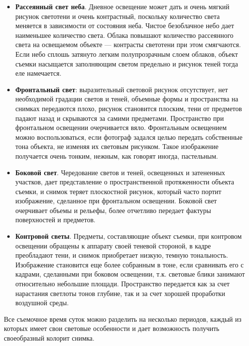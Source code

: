 \documentclass{article}
\begin{document}
\begin{itemize}
\item \textbf{Рассеянный свет неба}. Дневное освещение может дать и очень мягкий рисунок светотени и очень контрастный, поскольку количество света меняется в зависимости от состояния неба. Чистое безоблачное небо дает наименьшее количество света. Облака повышают количество рассеянного света на освещаемом объекте --- контрасты светотени при этом смягчаются. Если небо сплошь затянуто легким полупрозрачным слоем облаков, объект съемки насыщается заполняющим светом предельно и рисунок теней тогда еле намечается.
\item \textbf{Фронтальный свет}: выразительный световой рисунок отсутствует, нет необходимой градации светов и теней, объемные формы и пространства на снимках передаются плохо, рисунок становится плоским, тени от предметов падают назад и скрываются за самими предметами. Пространство при фронтальном освещении очерчивается вяло. Фронтальным освещением можно воспользоваться, если фотограф задался целью передать собственные тона объекта, не изменяя их световым рисунком. Такое изображение получается очень тонким, нежным, как говорят иногда, пастельным.
\item \textbf{Боковой свет}. Чередование светов и теней, освещенных и затененных участков, дает представление о пространственной протяженности объекта съемки, и снимок теряет плоскостной рисунок, который часто портит изображение, сделанное при фронтальном освещении. Боковой свет очерчивает объемы и рельефы, более отчетливо передает фактуры поверхностей и предметов.
\item \textbf{Контровой светы}. Предметы, составляющие объект съемки, при контровом освещении обращены к аппарату своей теневой стороной, в кадре преобладают тени, и снимок приобретает низкую, темную тональность. Изображение становится еще более собранным в тоне, если сравнивать его с кадрами, сделанными при боковом освещении, т.к. световые блики занимают относительно небольшие площади. Пространство передается как за счет нарастания светлоты тонов глубине, так и за счет хорошей проработки воздушной среды.
\end{itemize}
Все съемочное время суток можно разделить на несколько периодов, каждый из которых имеет свои световые особенности и дает возможность получить своеобразный колорит снимка.
\end{document}
